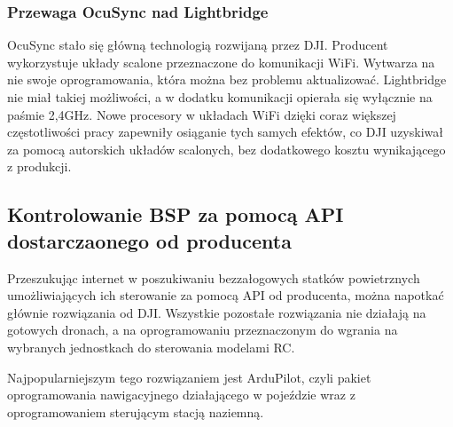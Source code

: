 \newpage

\subsubsection{Przewaga OcuSync nad Lightbridge}
OcuSync stało się główną technologią rozwijaną przez DJI. Producent wykorzystuje układy scalone przeznaczone do komunikacji WiFi. Wytwarza na nie swoje oprogramowania, która można bez problemu aktualizować. Lightbridge nie miał takiej możliwości, a w dodatku komunikacji opierała się wyłącznie na paśmie 2,4GHz. Nowe procesory w układach WiFi dzięki coraz większej częstotliwości pracy zapewniły osiąganie tych samych efektów, co DJI uzyskiwał za pomocą autorskich układów scalonych, bez dodatkowego kosztu wynikającego z produkcji.

\subsection{Kontrolowanie BSP za pomocą API dostarczaonego od producenta}
Przeszukując internet w poszukiwaniu bezzałogowych statków powietrznych umożliwiających ich sterowanie za pomocą API od producenta, można napotkać głównie rozwiązania od DJI. Wszystkie pozostałe rozwiązania nie działają na gotowych dronach, a na oprogramowaniu przeznaczonym do wgrania na wybranych jednostkach do sterowania modelami RC.

Najpopularniejszym tego rozwiązaniem jest ArduPilot, czyli pakiet oprogramowania nawigacyjnego działającego w pojeździe wraz z oprogramowaniem sterującym stacją naziemną.

